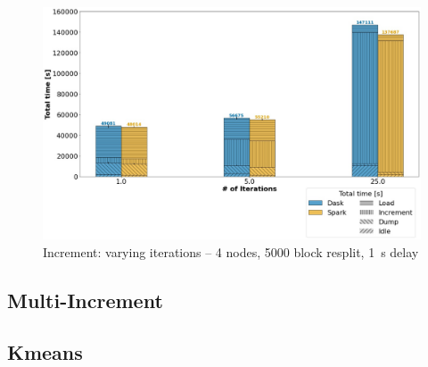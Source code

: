 \documentclass[conference]{IEEEtran}
\begin{document}
\begin{figure}[!h]
	\centering
	\includegraphics[clip,width=\columnwidth]{figures/stacked_increment_itr.jpg}
	\caption{Increment: varying iterations -- 4 nodes, 5000 block resplit, \SI{1}{\second} delay}
	\label{fig:increment_itr}
\end{figure}



\subsection{Multi-Increment}

\subsection{Kmeans}
\end{document}
